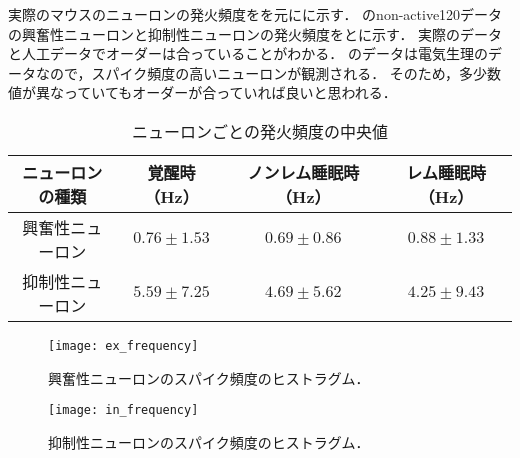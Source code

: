 実際のマウスのニューロンの発火頻度を\cite{Watson2016}を元にに示す．
のnon-active120データの興奮性ニューロンと抑制性ニューロンの発火頻度をとに示す．
実際のデータと人工データでオーダーは合っていることがわかる．
のデータは電気生理のデータなので，スパイク頻度の高いニューロンが観測される．
そのため，多少数値が異なっていてもオーダーが合っていれば良いと思われる．
\begin{table}[htb]
  \center
  \begin{tabular}{|c|ccc|} \hline
    ニューロンの種類 & 覚醒時（Hz） & ノンレム睡眠時（Hz） & レム睡眠時（Hz） \\ \hline
		興奮性ニューロン & $0.76 \pm 1.53$ & $0.69 \pm 0.86$ & $0.88 \pm 1.33$ \\
		抑制性ニューロン & $5.59 \pm 7.25$ & $4.69 \pm 5.62$ & $4.25 \pm 9.43$ \\ \hline
  \end{tabular}
  \caption{ニューロンごとの発火頻度の中央値}
  \label{tab:spike-frequency}
\end{table}
\begin{figure}[htbp]
    \begin{minipage}{0.5\hsize}
			\begin{center}
					\texttt{[image: ex\_frequency]}
					\caption{興奮性ニューロンのスパイク頻度のヒストラグム．}
					\label{fig:ex_frequency}
			\end{center}
		\end{minipage}
    \begin{minipage}{0.5\hsize}
			\begin{center}
					\texttt{[image: in\_frequency]}
					\caption{抑制性ニューロンのスパイク頻度のヒストラグム．}
					\label{fig:in_frequency}
			\end{center}
		\end{minipage}
\end{figure}
